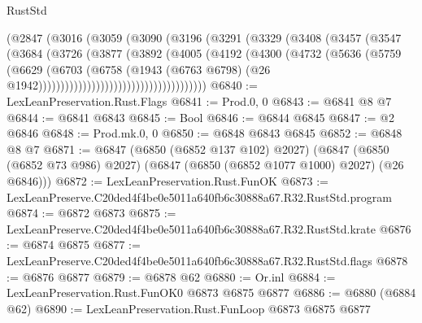 \begin{lexlean}{RustStd}
\begin{coremodule}
                              (@2847
                                (@3016
                                  (@3059
                                    (@3090
                                      (@3196
                                        (@3291
                                          (@3329
                                            (@3408
                                              (@3457
                                                (@3547
                                                  (@3684
                                                    (@3726
                                                      (@3877
                                                        (@3892
                                                          (@4005
                                                            (@4192
                                                              (@4300
                                                                (@4732
                                                                  (@5636
                                                                    (@5759
                                                                      (@6629
                                                                        (@6703
                                                                          (@6758
                                                                            (@1943
                                                                              (@6763 @6798)
                                                                              (@26
                                                                                @1942))))))))))))))))))))))))))))))))))))))
@6840 := LexLeanPreservation.Rust.Flags
@6841 := Prod.{0, 0}
@6843 := @6841 @8 @7
@6844 := @6841 @6843
@6845 := Bool
@6846 := @6844 @6845
@6847 := @2 @6846
@6848 := Prod.mk.{0, 0}
@6850 := @6848 @6843 @6845
@6852 := @6848 @8 @7
@6871 := @6847
    (@6850 (@6852 @137 @102) @2027)
    (@6847 (@6850 (@6852 @73 @986) @2027) (@6847 (@6850 (@6852 @1077 @1000) @2027) (@26 @6846)))
@6872 := LexLeanPreservation.Rust.FunOK
@6873 := LexLeanPreserve.C20ded4f4be0e5011a640fb6c30888a67.R32.RustStd.program
@6874 := @6872 @6873
@6875 := LexLeanPreserve.C20ded4f4be0e5011a640fb6c30888a67.R32.RustStd.krate
@6876 := @6874 @6875
@6877 := LexLeanPreserve.C20ded4f4be0e5011a640fb6c30888a67.R32.RustStd.flags
@6878 := @6876 @6877
@6879 := @6878 @62
@6880 := Or.inl
@6884 := LexLeanPreservation.Rust.FunOK0 @6873 @6875 @6877
@6886 := @6880 (@6884 @62)
@6890 := LexLeanPreservation.Rust.FunLoop @6873 @6875 @6877

\end{coremodule}
\end{lexlean}
